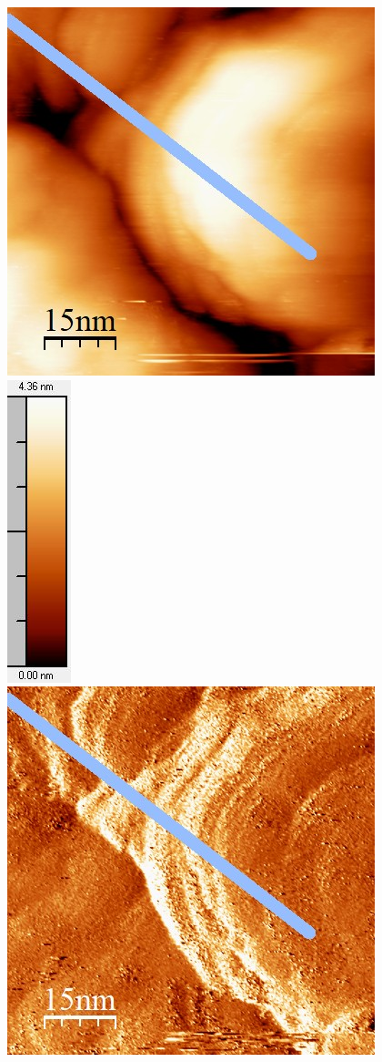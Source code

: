 \documentclass[12pt,a4paper]{article}
\begin{document}
\begin{figure}[H]
\includegraphics[scale=0.6]{Bilder/Anhang/IGain/1000_IGain_nach.jpg}
\includegraphics[scale=0.6]{Bilder/Anhang/IGain/1000_IGain_nach_Skala.jpg}
\includegraphics[scale=0.6]{Bilder/Anhang/IGain/Strom/1000_IGain_Strom_vor.jpg}

\end{figure}
\end{document}
